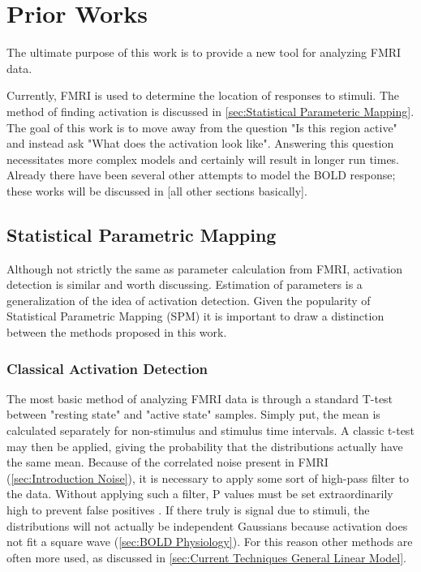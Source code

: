 \chapter{Prior Works}
The ultimate purpose of this work is to provide a new tool
for analyzing FMRI data. 

Currently, FMRI is used to determine the location of responses
to stimuli. The method of finding activation is discussed in 
\autoref{sec:Statistical Parameteric Mapping}. The goal of this 
work is to move away from the question "Is this region active"
and instead ask "What does the activation look like". Answering
this question necessitates more complex models and certainly
will result in longer run times. Already there have been several other
attempts to model the BOLD response; these works will be discussed
in [all other sections basically].

\section{Statistical Parametric Mapping}
Although not strictly the same as parameter calculation from 
FMRI, activation detection is similar and worth discussing. Estimation of 
parameters is a generalization of the idea of activation detection.
Given the popularity of Statistical Parametric Mapping (SPM) 
it is important to draw a distinction between the methods proposed
in this work.

\subsection{Classical Activation Detection}
\label{sec:Square Wave}
The most basic method of analyzing FMRI data is through a standard T-test
between "resting state" and "active state" samples. Simply put, the
mean is calculated separately for non-stimulus and stimulus time intervals.
A classic t-test may then be applied, giving the probability that the
distributions actually have the same mean. Because of the correlated
noise present in FMRI (\autoref{sec:Introduction Noise}), it is necessary
to apply some sort of high-pass filter to the data. Without applying
such a filter, P values must be set extraordinarily high to prevent
false positives \cite{Smith2007}. If there truly is signal
due to stimuli, the distributions will not actually be independent
Gaussians because activation does not fit a square wave 
(\autoref{sec:BOLD Physiology}). For this reason other methods
are often more used, as discussed in 
\autoref{sec:Current Techniques General Linear Model}.

